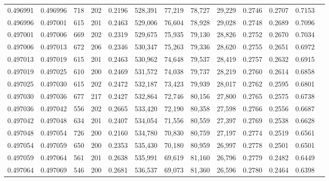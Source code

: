 \begin{tabular}{rrrrrrrrrrrrr}
0.496991 & 0.496996 &   718 & 202 &                                     0.2196 & 528,391 &  77,219 &  78,727 &  29,229 & 0.2746 & 0.2707 & 0.7153 \\
0.496996 & 0.497001 &   615 & 201 &                                     0.2463 & 529,006 &  76,604 &  78,928 &  29,028 & 0.2748 & 0.2689 & 0.7096 \\
0.497001 & 0.497006 &   669 & 202 &                                     0.2319 & 529,675 &  75,935 &  79,130 &  28,826 & 0.2752 & 0.2670 & 0.7034 \\
0.497006 & 0.497013 &   672 & 206 &                                     0.2346 & 530,347 &  75,263 &  79,336 &  28,620 & 0.2755 & 0.2651 & 0.6972 \\
0.497013 & 0.497019 &   615 & 201 &                                     0.2463 & 530,962 &  74,648 &  79,537 &  28,419 & 0.2757 & 0.2632 & 0.6915 \\
0.497019 & 0.497025 &   610 & 200 &                                     0.2469 & 531,572 &  74,038 &  79,737 &  28,219 & 0.2760 & 0.2614 & 0.6858 \\
0.497025 & 0.497030 &   615 & 202 &                                     0.2472 & 532,187 &  73,423 &  79,939 &  28,017 & 0.2762 & 0.2595 & 0.6801 \\
0.497030 & 0.497036 &   677 & 217 &                                     0.2427 & 532,864 &  72,746 &  80,156 &  27,800 & 0.2765 & 0.2575 & 0.6738 \\
0.497036 & 0.497042 &   556 & 202 &                                     0.2665 & 533,420 &  72,190 &  80,358 &  27,598 & 0.2766 & 0.2556 & 0.6687 \\
0.497042 & 0.497048 &   634 & 201 &                                     0.2407 & 534,054 &  71,556 &  80,559 &  27,397 & 0.2769 & 0.2538 & 0.6628 \\
0.497048 & 0.497054 &   726 & 200 &                                     0.2160 & 534,780 &  70,830 &  80,759 &  27,197 & 0.2774 & 0.2519 & 0.6561 \\
0.497054 & 0.497059 &   650 & 200 &                                     0.2353 & 535,430 &  70,180 &  80,959 &  26,997 & 0.2778 & 0.2501 & 0.6501 \\
0.497059 & 0.497064 &   561 & 201 &                                     0.2638 & 535,991 &  69,619 &  81,160 &  26,796 & 0.2779 & 0.2482 & 0.6449 \\
0.497064 & 0.497069 &   546 & 200 &                                     0.2681 & 536,537 &  69,073 &  81,360 &  26,596 & 0.2780 & 0.2464 & 0.6398 \\

\end{tabular}
